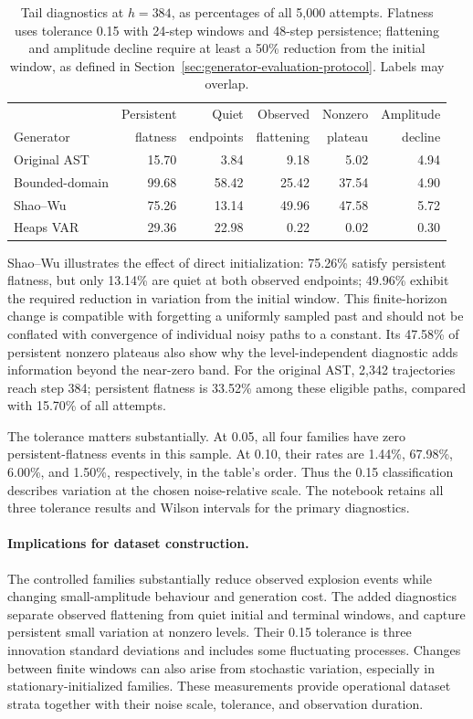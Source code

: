 \begin{table}[H]
\centering\small
\begin{tabular}{@{}lrrrrr@{}}
\toprule
& Persistent & Quiet & Observed & Nonzero & Amplitude \\
Generator & flatness & endpoints & flattening & plateau & decline \\
\midrule
Original AST & 15.70 & 3.84 & 9.18 & 5.02 & 4.94 \\
Bounded-domain & 99.68 & 58.42 & 25.42 & 37.54 & 4.90 \\
Shao--Wu & 75.26 & 13.14 & 49.96 & 47.58 & 5.72 \\
Heaps VAR & 29.36 & 22.98 & 0.22 & 0.02 & 0.30 \\
\bottomrule
\end{tabular}
\caption{Tail diagnostics at $h=384$, as percentages of all 5,000 attempts.
Flatness uses tolerance 0.15 with 24-step windows and 48-step persistence;
flattening and amplitude decline require at least a 50\% reduction from the
initial window, as defined in Section~\ref{sec:generator-evaluation-protocol}.
Labels may overlap.}
\label{tab:generator-tail-outcomes}
\end{table}

Shao--Wu illustrates the effect of direct initialization: 75.26\% satisfy
persistent flatness, but only 13.14\% are quiet at both observed endpoints;
49.96\% exhibit the required reduction in variation from the initial window.
This finite-horizon change is compatible with forgetting a uniformly sampled
past and should not be conflated with convergence of individual noisy paths
to a constant. Its 47.58\% of persistent nonzero plateaus also show why the
level-independent diagnostic adds information beyond the near-zero band.
For the original AST,
2,342 trajectories reach step 384; persistent flatness is 33.52\% among these
eligible paths, compared with 15.70\% of all attempts.

The tolerance matters substantially. At 0.05, all four families have zero
persistent-flatness events in this sample. At 0.10, their rates are 1.44\%,
67.98\%, 6.00\%, and 1.50\%, respectively, in the table's order.
Thus the 0.15 classification describes variation at the chosen noise-relative
scale. The notebook retains all three tolerance results and Wilson intervals
for the primary diagnostics.


\paragraph{Implications for dataset construction.}
The controlled families substantially reduce observed explosion events while
changing small-amplitude behaviour and generation cost. The added diagnostics
separate observed flattening from quiet initial and terminal windows, and
capture persistent small variation at nonzero levels. Their 0.15 tolerance
is three innovation standard deviations and includes some fluctuating
processes. Changes between finite windows can also arise from stochastic
variation, especially in stationary-initialized families. These measurements
provide operational dataset strata together with their noise scale, tolerance,
and observation duration.

